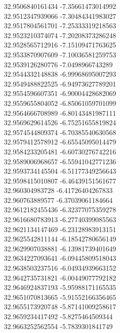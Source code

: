 {32.9506840161434	-7.35661473014992\\
32.9512347939066	-7.30484341983027\\
32.9517804561701	-7.25333319218563\\
32.9523210374074	-7.20208373286248\\
32.9528565712916	-7.15109471763625\\
32.9533870907609	-7.10036581259753\\
32.9539126280776	-7.0498966743289\\
32.9544332148838	-6.99968695007293\\
32.9549488822525	-6.94973627789201\\
32.9554596607351	-6.90004428682069\\
32.9559655804052	-6.85061059701099\\
32.9564666708989	-6.80143481987111\\
32.9569629614526	-6.75251655819824\\
32.9574544809374	-6.70385540630568\\
32.9579412578912	-6.65545095014479\\
32.9584233205481	-6.60730276742216\\
32.9589006968657	-6.55941042771236\\
32.9593734145504	-6.51177349256643\\
32.9598415010807	-6.46439151561677\\
32.960304983728	-6.41726404267833\\
32.960763889577	-6.37039061184664\\
32.9612182455436	-6.32377075359278\\
32.9616680783913	-6.27740399085563\\
32.9621134147469	-6.23128983913151\\
32.9625542811144	-6.18542780656149\\
32.9629907038881	-6.13981739401649\\
32.9634227093641	-6.09445809518043\\
32.9638503237516	-6.04934939663152\\
32.9642735731821	-6.00449077792182\\
32.9646924837193	-5.95988171165535\\
32.9651070813665	-5.91552166356465\\
32.9655173920748	-5.87141009258617\\
32.9659234417492	-5.8275464509344\\
32.9663252562554	-5.7839301841749\\
}
